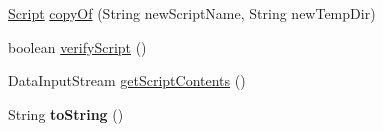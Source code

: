 \begin{DoxyCompactItemize}
\item 
\hyperlink{class_c_a_s_u_a_l_1_1caspac_1_1_script}{Script} \hyperlink{class_c_a_s_u_a_l_1_1caspac_1_1_script_ae19c81a3460603a10818522d801e43ca}{copy\-Of} (String new\-Script\-Name, String new\-Temp\-Dir)
\item 
boolean \hyperlink{class_c_a_s_u_a_l_1_1caspac_1_1_script_a650e8a68460d2e087028c6b7222ff61d}{verify\-Script} ()
\item 
Data\-Input\-Stream \hyperlink{class_c_a_s_u_a_l_1_1caspac_1_1_script_a17a45608b9e9de9ab8f083781e0ef9b4}{get\-Script\-Contents} ()
\item 
\hypertarget{class_c_a_s_u_a_l_1_1caspac_1_1_script_aa4417a95f79b967e72da3e7e9bd6458e}{String {\bfseries to\-String} ()}\label{class_c_a_s_u_a_l_1_1caspac_1_1_script_aa4417a95f79b967e72da3e7e9bd6458e}


\end{DoxyCompactItemize}
